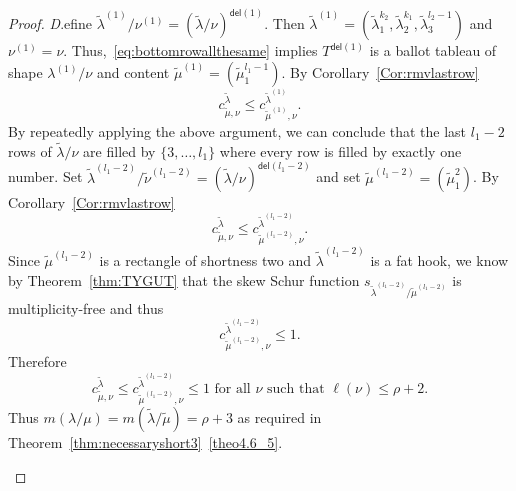 \documentclass[10pt]{article}
\theoremstyle{definition}
\newcommand{\del}{\mathsf{del}}
\newenvironment{Case}[1]{\par\vskip2pt\noindent%
\emph{#1}.}{\vskip2pt}
\begin{document}
\begin{proof}
\begin{Case}
Define $\tilde \lambda^{(1)}/ \nu^{(1)} = (\tilde \lambda / \nu)^{\del (1)}$. Then $\tilde\lambda^{(1)} = (\tilde\lambda_1^{k_2},\tilde\lambda_2^{k_1},\tilde\lambda_3^{l_2-1})$ and $\nu^{(1)} = \nu$. Thus,~\eqref{eq:bottomrowallthesame} implies $T^{\del (1)}$ is a ballot tableau of shape $\lambda^{(1)}/\nu$ and content $\tilde \mu^{(1)} = (\tilde\mu_1^{l_1-1})$. By Corollary~\ref{Cor:rmvlastrow}
\[
c^{\tilde\lambda}_{\tilde\mu,\nu} \leq c^{\tilde\lambda^{(1)}}_{\tilde\mu^{(1)},\nu}.
\]
By repeatedly applying the above argument, we can conclude that the last $l_1-2$ rows of $\tilde\lambda/\nu$ are filled by $\{3,\ldots,l_1\}$ where every row is filled by exactly one number. Set $\tilde \lambda^{(l_1-2)} / \tilde \nu^{(l_1-2)} = (\tilde \lambda / \nu)^{\del (l_1-2)}$ and set $\tilde\mu^{(l_1-2)} = (\tilde \mu_1^2)$. By Corollary~\ref{Cor:rmvlastrow}
\[
c^{\tilde\lambda}_{\tilde\mu,\nu}\leq c^{\tilde \lambda^{(l_1-2)}}_{\tilde \mu^{(l_1-2)},\nu}.
\]
Since $\tilde\mu^{(l_1-2)}$ is a rectangle of shortness two and $\tilde \lambda^{(l_1-2)}$ is a fat hook, we know by Theorem~\ref{thm:TYGUT} that the skew Schur function $s_{\tilde\lambda^{(l_1-2)}/\tilde\mu^{(l_1-2)}}$ is multiplicity-free and thus
\[
c^{\tilde \lambda^{(l_1-2)}}_{\tilde \mu^{(l_1-2)},\nu} \leq 1.
\]
Therefore 
\[
c^{\tilde\lambda}_{\tilde\mu,\nu} \leq c^{\tilde \lambda^{(l_1-2)}}_{\tilde \mu^{(l_1-2)},\nu} \leq 1 \text{ for all }\nu\text{ such that }\ell(\nu)\leq \rho+2.
\]
Thus $m(\lambda/\mu) = m(\tilde\lambda/\tilde\mu) = \rho+3$ as required in Theorem~\ref{thm:necessaryshort3}~\ref{theo4.6_5}.


\begin{figure}[b]\centering
\end{figure}
\end{Case}
\end{proof}
\end{document}
